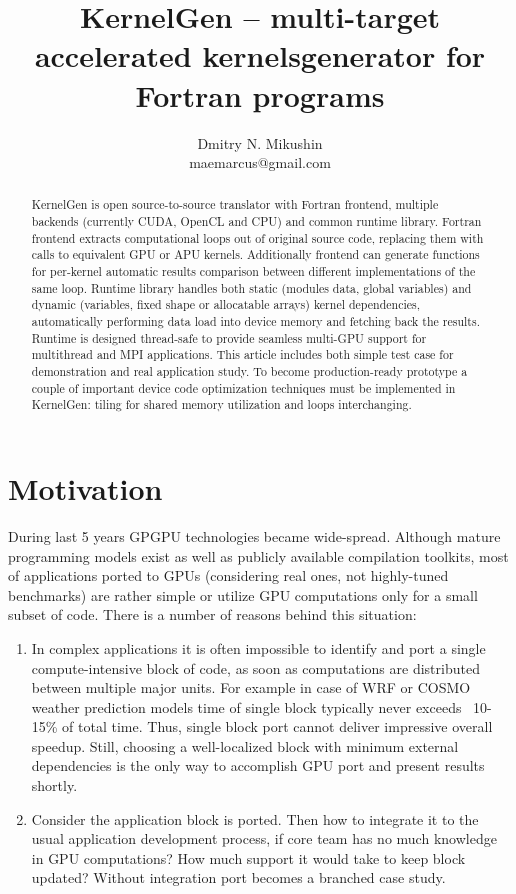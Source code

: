 \documentclass[a4,12pt]{article}
\title{KernelGen -- multi-target accelerated kernels\linebreak generator for Fortran programs}
\author{Dmitry N. Mikushin\\ maemarcus@gmail.com}
\begin{document}
\maketitle

\begin{abstract}

KernelGen is open source-to-source translator with Fortran frontend, multiple backends (currently CUDA, OpenCL and CPU) and common runtime library. Fortran frontend extracts computational loops out of original source code, replacing them with calls to equivalent GPU or APU kernels. Additionally frontend can generate functions for per-kernel automatic results comparison between different implementations of the same loop. Runtime library handles both static (modules data, global variables) and dynamic (variables, fixed shape or allocatable arrays) kernel dependencies, automatically performing data load into device memory and fetching back the results. Runtime is designed thread-safe to provide seamless multi-GPU support for multithread and MPI applications. This article includes both simple test case for demonstration and real application study. To become production-ready prototype a couple of important device code optimization techniques must be implemented in KernelGen: tiling for shared memory utilization and loops interchanging.

\end{abstract}

\section{Motivation}

During last 5 years GPGPU technologies became wide-spread. Although mature programming models exist as well as publicly available compilation toolkits, most of applications ported to GPUs (considering real ones, not highly-tuned benchmarks) are rather simple or utilize GPU computations only for a small subset of code. There is a number of reasons behind this situation:

\begin{enumerate}
\item In complex applications it is often impossible to identify and port a single compute-intensive block of code, as soon as computations are distributed between multiple major units. For example in case of WRF or COSMO weather prediction models time of single block typically never exceeds ~10-15\% of total time. Thus, single block port cannot deliver impressive overall speedup. Still, choosing a well-localized block with minimum external dependencies is the only way to accomplish GPU port and present results shortly.
\item Consider the application block is ported. Then how to integrate it to the usual application development process, if core team has no much knowledge in GPU computations? How much support it would take to keep block updated? Without integration port becomes a branched case study.
\end{enumerate}
\end{document}
